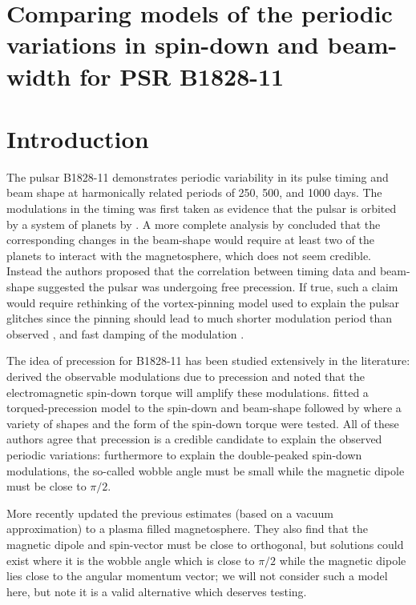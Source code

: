 \documentclass[../full_thesis/full_thesis.tex]{subfiles}
\newcommand{\thisdir}{../comparing_periodic_modulations}
\begin{document}
 

\section{Comparing models of the periodic variations in spin-down
         and beam-width for PSR B1828-11}



\section{Introduction}
\label{sec: introduction}

The pulsar B1828-11 demonstrates periodic variability in its pulse timing and
beam shape at harmonically related periods of 250, 500, and 1000 days. The
modulations in the timing was first taken as evidence that the pulsar is
orbited by a system of planets by \citet{Bailes1993}. A more complete analysis
by \citet{Stairs2000} concluded that the corresponding changes in the
beam-shape would require at least two of the planets to interact with the
magnetosphere, which does not seem credible. Instead the authors proposed that
the correlation between timing data and beam-shape suggested the pulsar was
undergoing free precession. If true, such a claim would require rethinking of
the vortex-pinning model used to explain the pulsar glitches since the pinning
should lead to much shorter modulation period than observed \citep{Shaham1977},
and fast damping of the modulation \citep{Link2003}.

The idea of precession for B1828-11 has been studied extensively in the
literature: \citet{Jones2001} derived the observable modulations due to
precession and noted that the electromagnetic spin-down torque will amplify
these modulations.  \citet{Link2001} fitted a torqued-precession model to the
spin-down and beam-shape followed by \citet{Akgun2006} where a variety of
shapes and the form of the spin-down torque were tested.  All of these authors
agree that precession is a credible candidate to explain the observed periodic
variations: furthermore to explain the double-peaked spin-down modulations, the
so-called wobble angle must be small while the magnetic dipole must be close to
$\pi/2$.

More recently \citet{Arzamasskiy2015} updated the previous estimates (based on
a vacuum approximation) to a plasma filled magnetosphere. They also find that
the magnetic dipole and spin-vector must be close to orthogonal, but solutions
could exist where it is the wobble angle which is close to $\pi/2$ while the
magnetic dipole lies close to the angular momentum vector; we will not consider
such a model here, but note it is a valid alternative which deserves testing.
\end{document}
